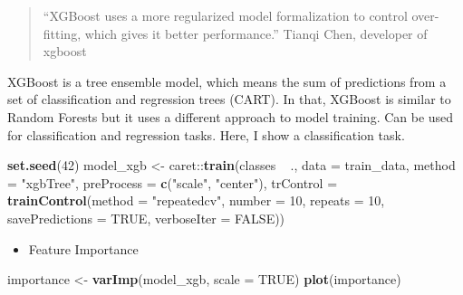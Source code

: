 \documentclass[]{article}
\newenvironment{Shaded}{\begin{snugshade}}{\end{snugshade}}
\newcommand{\KeywordTok}[1]{\textcolor[rgb]{0.13,0.29,0.53}{\textbf{{#1}}}}
\newcommand{\DataTypeTok}[1]{\textcolor[rgb]{0.13,0.29,0.53}{{#1}}}
\newcommand{\DecValTok}[1]{\textcolor[rgb]{0.00,0.00,0.81}{{#1}}}
\newcommand{\StringTok}[1]{\textcolor[rgb]{0.31,0.60,0.02}{{#1}}}
\newcommand{\OtherTok}[1]{\textcolor[rgb]{0.56,0.35,0.01}{{#1}}}
\newcommand{\NormalTok}[1]{{#1}}
\providecommand{\tightlist}{%
  \setlength{\itemsep}{0pt}\setlength{\parskip}{0pt}}
\begin{document}
\begin{quote}
``XGBoost uses a more regularized model formalization to control
over-fitting, which gives it better performance.'' Tianqi Chen,
developer of xgboost
\end{quote}

XGBoost is a tree ensemble model, which means the sum of predictions
from a set of classification and regression trees (CART). In that,
XGBoost is similar to Random Forests but it uses a different approach to
model training. Can be used for classification and regression tasks.
Here, I show a classification task.

\begin{Shaded}
\begin{Highlighting}[]
\KeywordTok{set.seed}\NormalTok{(}\DecValTok{42}\NormalTok{)}
\NormalTok{model_xgb <-}\StringTok{ }\NormalTok{caret::}\KeywordTok{train}\NormalTok{(classes ~}\StringTok{ }\NormalTok{.,}
                          \DataTypeTok{data =} \NormalTok{train_data,}
                          \DataTypeTok{method =} \StringTok{"xgbTree"}\NormalTok{,}
                          \DataTypeTok{preProcess =} \KeywordTok{c}\NormalTok{(}\StringTok{"scale"}\NormalTok{, }\StringTok{"center"}\NormalTok{),}
                          \DataTypeTok{trControl =} \KeywordTok{trainControl}\NormalTok{(}\DataTypeTok{method =} \StringTok{"repeatedcv"}\NormalTok{, }
                                                  \DataTypeTok{number =} \DecValTok{10}\NormalTok{, }
                                                  \DataTypeTok{repeats =} \DecValTok{10}\NormalTok{, }
                                                  \DataTypeTok{savePredictions =} \OtherTok{TRUE}\NormalTok{, }
                                                  \DataTypeTok{verboseIter =} \OtherTok{FALSE}\NormalTok{))}
\end{Highlighting}
\end{Shaded}

\begin{itemize}
\tightlist
\item
  Feature Importance
\end{itemize}

\begin{Shaded}
\begin{Highlighting}[]
\NormalTok{importance <-}\StringTok{ }\KeywordTok{varImp}\NormalTok{(model_xgb, }\DataTypeTok{scale =} \OtherTok{TRUE}\NormalTok{)}
\KeywordTok{plot}\NormalTok{(importance)}
\end{Highlighting}
\end{Shaded}
\end{document}
